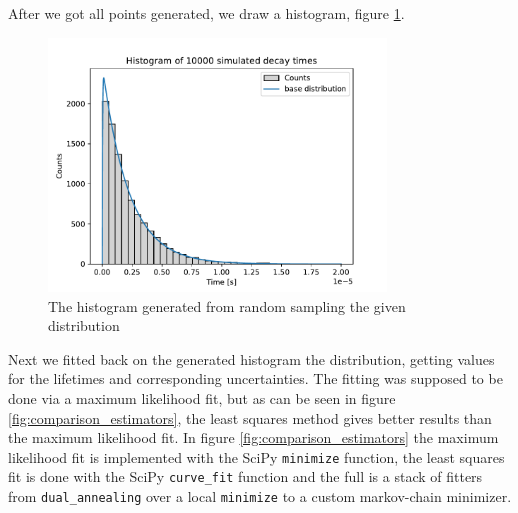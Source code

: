 \documentclass[11pt, a4paper, oneside]{book}
\newcommand\Plotwidth{0.8}
\begin{document}
After we got all points generated, we draw a histogram, figure \ref{fig:histogram}.

\begin{figure}[h]
    \centering
    \includegraphics[width=\Plotwidth\textwidth]{images/simulated_decay_histogram.pdf}
    \caption{The histogram generated from random sampling the given distribution}
    \label{fig:histogram}
\end{figure}

Next we fitted back on the generated histogram the distribution, getting values for the lifetimes and corresponding uncertainties. The fitting was supposed to be done via a maximum likelihood fit, but as can be seen in figure \ref{fig:comparison_estimators}, the least squares method gives better results than the maximum likelihood fit. In figure \ref{fig:comparison_estimators} the maximum likelihood fit is implemented with the SciPy \lstinline|minimize| function, the least squares fit is done with the SciPy \lstinline|curve_fit| function and the full is a stack of fitters from \lstinline|dual_annealing| over a local \lstinline|minimize| to a custom markov-chain minimizer.
\end{document}
